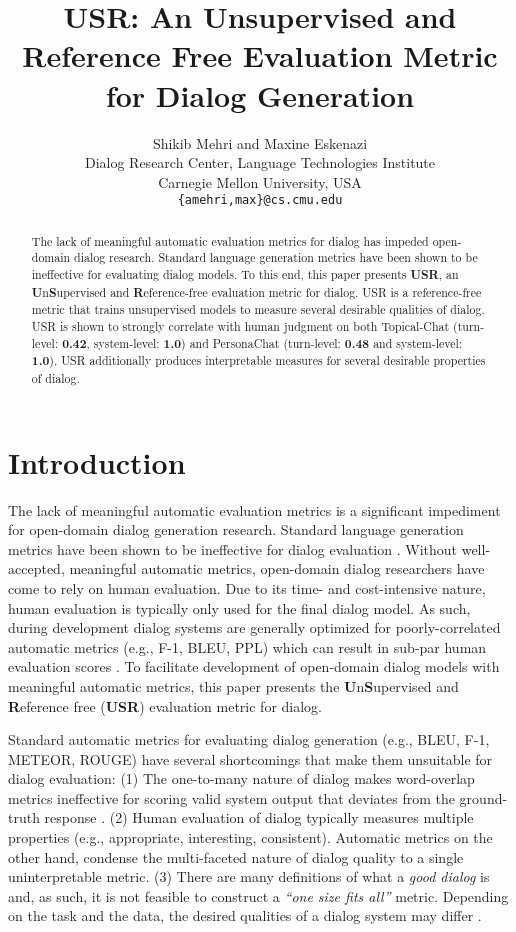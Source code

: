 \documentclass[11pt,a4paper]{article}
\title{USR: An Unsupervised and Reference Free Evaluation Metric for Dialog Generation}
\author{Shikib Mehri and Maxine Eskenazi \\
  Dialog Research Center, Language Technologies Institute \\
  Carnegie Mellon University, USA \\
  \texttt{\{amehri,max\}@cs.cmu.edu}}
\date{}
\begin{document}
\maketitle
\begin{abstract}
The lack of meaningful automatic evaluation metrics for dialog has impeded open-domain dialog research. Standard language generation metrics have been shown to be ineffective for evaluating dialog models. To this end, this paper presents \textbf{USR}, an \textbf{U}n\textbf{S}upervised and \textbf{R}eference-free evaluation metric for dialog. USR is a reference-free metric that trains unsupervised models to measure several desirable qualities of dialog. USR is shown to strongly correlate with human judgment on both Topical-Chat (turn-level: \textbf{0.42}, system-level: \textbf{1.0}) and PersonaChat (turn-level: \textbf{0.48} and system-level: \textbf{1.0}). USR additionally produces interpretable measures for several desirable properties of dialog. 
\end{abstract}

\section{Introduction}

The lack of meaningful automatic evaluation metrics is a significant impediment for open-domain dialog generation research. Standard language generation metrics have been shown to be ineffective for dialog evaluation \citep{deriu2019survey,liu2016not}. Without well-accepted, meaningful automatic metrics, open-domain dialog researchers have come to rely on human evaluation. Due to its time- and cost-intensive nature, human evaluation is typically only used for the final dialog model. As such, during development dialog systems are generally optimized for poorly-correlated automatic metrics (e.g., F-1, BLEU, PPL) which can result in sub-par human evaluation scores \citep{dinan2019second}. To facilitate development of open-domain dialog models with meaningful automatic metrics, this paper presents the \textbf{U}n\textbf{S}upervised and \textbf{R}eference free (\textbf{USR}) evaluation metric for dialog. 

Standard automatic metrics for evaluating dialog generation (e.g., BLEU, F-1, METEOR, ROUGE) have several shortcomings that make them unsuitable for dialog evaluation: (1) The one-to-many nature of dialog \citep{zhao2017learning} makes word-overlap metrics ineffective for scoring valid system output that deviates from the ground-truth response \citep{liu2016not,gupta2019investigating}. (2) Human evaluation of dialog typically measures multiple properties (e.g., appropriate, interesting, consistent). Automatic metrics on the other hand, condense the multi-faceted nature of dialog quality to a single uninterpretable metric. (3) There are many definitions of what a \textit{good dialog} is and, as such, it is not feasible to construct a \textit{``one size fits all''} metric. Depending on the task and the data, the desired qualities of a dialog system may differ \cite{walker1997paradise,deriu2019survey}.
\end{document}
